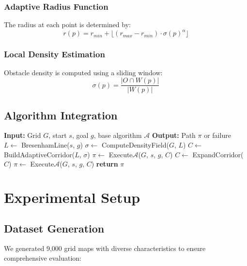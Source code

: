\documentclass[journal]{IEEEtran}
\begin{document}
\subsubsection{Adaptive Radius Function}
The radius at each point is determined by:
\begin{equation}
r(p) = r_{min} + \lfloor(r_{max} - r_{min}) \cdot \sigma(p)^\alpha\rfloor
\end{equation}

\subsubsection{Local Density Estimation}
Obstacle density is computed using a sliding window:
\begin{equation}
\sigma(p) = \frac{|O \cap W(p)|}{|W(p)|}
\end{equation}

\subsection{Algorithm Integration}

\begin{algorithm}
\caption{AILS-Enhanced Pathfinding}
\begin{algorithmic}[1]
\STATE \textbf{Input:} Grid $G$, start $s$, goal $g$, base algorithm $\mathcal{A}$
\STATE \textbf{Output:} Path $\pi$ or failure
\STATE
\STATE $L \leftarrow$ BresenhamLine($s$, $g$)
\STATE $\sigma \leftarrow$ ComputeDensityField($G$, $L$)
\STATE $C \leftarrow$ BuildAdaptiveCorridor($L$, $\sigma$)
\STATE
\STATE $\pi \leftarrow$ Execute$\mathcal{A}$($G$, $s$, $g$, $C$)
\IF{$\pi$ = $\emptyset$}
    \STATE $C \leftarrow$ ExpandCorridor($C$)
    \STATE $\pi \leftarrow$ Execute$\mathcal{A}$($G$, $s$, $g$, $C$)
\ENDIF
\STATE \textbf{return} $\pi$
\end{algorithmic}
\end{algorithm}

\section{Experimental Setup}

\subsection{Dataset Generation}

We generated 9,000 grid maps with diverse characteristics to ensure comprehensive evaluation:
\end{document}

